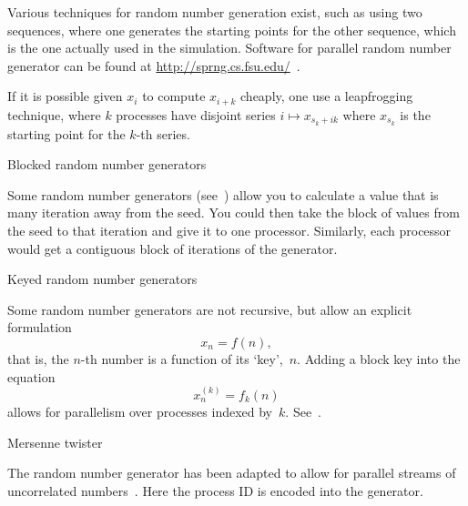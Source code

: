 Various techniques for random number generation exist, such as using
two sequences, where one generates the starting points for the other
sequence, which is the one actually used in the simulation. Software
for parallel random number generator can be found at
\url{http://sprng.cs.fsu.edu/}~\cite{Mascagni:SPRNG}.

If it is possible given $x_i$ to compute $x_{i+k}$ cheaply, one use a
leapfrogging technique, where $k$ processes have disjoint series
$i\mapsto x_{s_k+ik}$ where $x_{s_k}$ is the starting point for the
$k$-th series.

 {Blocked random number generators}

Some random number generators (see~\cite{LEcuyer:multiple-random})
allow you to calculate a value that is many iteration away from the seed.
You could then take the block of values from the seed to that iteration
and give it to one processor. Similarly, each processor would get a contiguous
block of iterations of the generator.

 {Keyed random number generators}

Some random number generators are not recursive, but allow
an explicit formulation \[ x_n = f(n), \]
that is, the $n$-th number is a function of its `key',~$n$.
Adding a block key into the equation
\[ x_n^{(k)} = f_k(n) \]
allows for parallelism over processes indexed by~$k$.
See~\cite{Salmon:prng123}.

 {Mersenne twister}

The  random number generator has been
adapted to allow for parallel streams of uncorrelated
numbers~\cite{Matsumoto:DynamicMersenne}. Here the process ID is
encoded into the generator.



